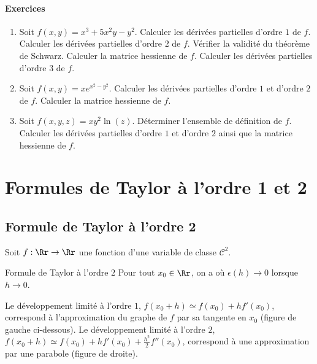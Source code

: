 \paragraph{Exercices}
    \begin{enumerate}
        \item Soit $f(x,y) = x^3+5x^2y-y^2$. Calculer les dérivées partielles d'ordre $1$ de $f$. Calculer les dérivées partielles d'ordre $2$ de $f$. Vérifier la validité du théorème de Schwarz. Calculer la matrice hessienne de $f$. Calculer les dérivées partielles d'ordre $3$ de $f$.
        
        \item Soit $f(x,y) = xe^{x^2-y^2}$. Calculer les dérivées partielles d'ordre $1$ et d'ordre $2$ de $f$. Calculer la matrice hessienne de $f$.
        
        \item Soit $f(x,y,z) = xy^2 \ln(z)$. Déterminer l'ensemble de définition de $f$. Calculer les dérivées partielles d'ordre $1$ et d'ordre $2$ ainsi que la matrice hessienne de $f$.                
    \end{enumerate}


\section{Formules de Taylor à l'ordre 1 et 2}
\subsection{Formule de Taylor à l'ordre 2}

Soit $f : \Rr \to \Rr$ une fonction d'une variable de classe $\mathcal{C}^2$. 
\begin{theoreme}{Formule de Taylor à l'ordre $2$}{} 
	Pour tout $x_0 \in \Rr$, on a
	où $\epsilon(h) \to 0$ lorsque $h\to0$.
\end{theoreme}

Le développement limité à l'ordre $1$, $f(x_0 + h) \simeq f(x_0) + hf'(x_0)$, correspond à l'approximation du graphe de $f$ par sa tangente en $x_0$ (figure de gauche ci-dessous).
Le développement limité à l'ordre $2$, $f(x_0 + h) \simeq f(x_0) + hf'(x_0) + \frac{h^2}{2} f''(x_0)$, correspond à une approximation par une parabole (figure de droite).




